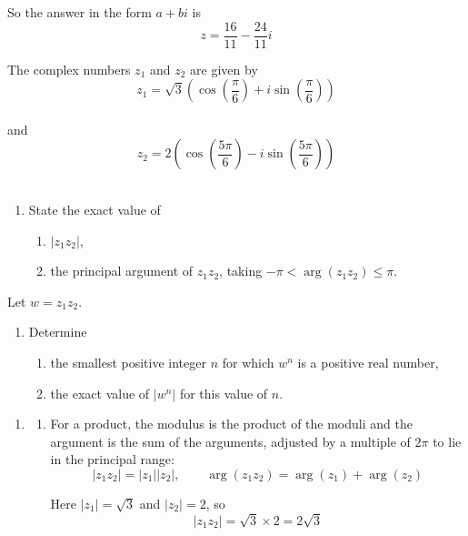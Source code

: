 \documentclass[leqno]{article}
\begin{document}
\begin{enumerate}[
  label=\textbf{\arabic*.},
  leftmargin=*,
  topsep=0pt,
  partopsep=0pt,
  parsep=0pt
]
\begin{djsSolution}
So the answer in the form \(a+bi\) is
\[
z=\dfrac{16}{11}-\dfrac{24}{11}i
\]
\end{djsSolution}

\newpage

\questionitem

The complex numbers $z_1$ and $z_2$ are given by
\[
z_1=\sqrt{3}\left(\cos\left(\frac{\pi}{6}\right)+i\sin\left(\frac{\pi}{6}\right)\right)
\] \\
and
\[
z_2=2\left(\cos\left(\frac{5\pi}{6}\right)-i\sin\left(\frac{5\pi}{6}\right)\right)
\] \\
\begin{enumerate}[label=\textbf{(\alph*)}]
\item State the exact value of
\begin{enumerate}[label=(\roman*)]
\item $|z_1z_2|$,
\item the principal argument of $z_1z_2$, taking $-\pi<\arg(z_1z_2)\leq\pi$.
\end{enumerate}
\end{enumerate}
Let $w=z_1z_2$. \\
\begin{enumerate}[label=\textbf{(\alph*)}, resume]
\item Determine
\begin{enumerate}[label=(\roman*)]
\item the smallest positive integer $n$ for which $w^n$ is a positive real number,
\item the exact value of $|w^n|$ for this value of $n$.
\end{enumerate}
\end{enumerate}

\vspace*{10pt}

\begin{djsSolution}
\begin{enumerate}[label=\textbf{(\alph*)}, start=1]
\item
\begin{enumerate}[label=(\roman*), start=1]
\item For a product, the modulus is the product of the moduli and the argument is the sum of the arguments, adjusted by a multiple of \(2\pi\) to lie in the principal range:
\[
|z_1z_2|=|z_1||z_2|,\qquad \arg(z_1z_2)=\arg(z_1)+\arg(z_2)
\]

Here \(|z_1|=\sqrt{3}\) and \(|z_2|=2\), so
\[
|z_1z_2|=\sqrt{3}\times2=2\sqrt{3}
\]


\end{enumerate}
\end{enumerate}
\end{djsSolution}
\end{enumerate}
\end{document}
